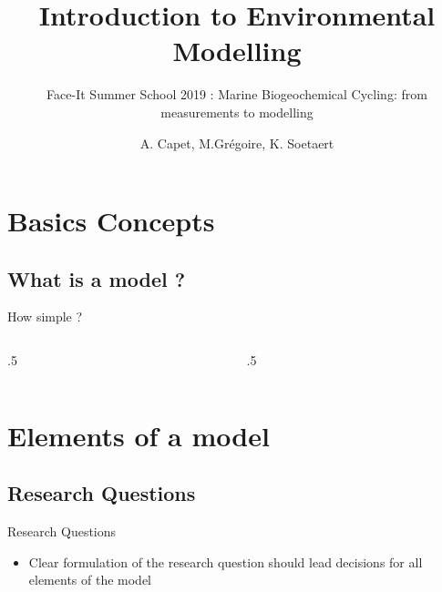 \documentclass[final,xcolor=dvipsnames]{beamer}
\title[Introduction to Environmental Modelling]{Introduction to Environmental Modelling}
\subtitle{Face-It Summer School 2019 : Marine Biogeochemical Cycling: from measurements to modelling}
\author[A. Capet]{A. Capet, M.Grégoire, K. Soetaert} %
\institute[http://labos.ulg.ac.be/mast/]{MAST - acapet@ulg.ac.be}
\date[Oct 2019]
\begin{document}
\def\mussel{\PHoxBack}
\def\extitle[#1]{\centering{ \mussel \hspace{2cm} #1 \hspace{2cm} \mussel}}

\begin{frame}
  \titlepage
\end{frame}


\section{Basics Concepts}
\subsection{What is a model ?}
\begin{frame}
\end{frame}

\begin{frame}{How simple ?}
\begin{columns}
\begin{column}{.5\framewidth}
\end{column}
\begin{column}{.5\framewidth}
\end{column}
\end{columns}
\end{frame}


\section{Elements of a model}
\subsection{Research Questions}

\begin{frame}
\begin{block}{Research Questions}
\begin{itemize}
    \item Clear formulation of the research question should lead decisions for all elements of the model 
\end{itemize}
\end{block}
\end{frame}
\end{document}
